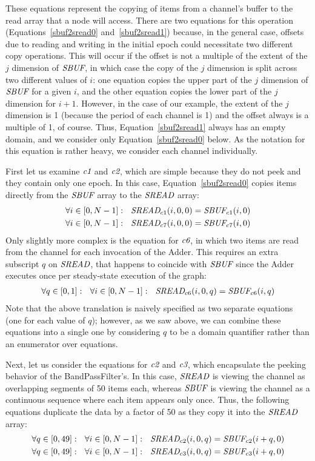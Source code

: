 
These equations represent the copying of items from a channel's buffer
to the read array that a node will access.  There are two equations
for this operation (Equations~\ref{sbuf2sread0} and~\ref{sbuf2sread1})
because, in the general case, offsets due to reading and writing in
the initial epoch could necessitate two different copy operations.
This will occur if the offset is not a multiple of the extent of the
$j$ dimension of $\mbox{\it SBUF}$, in which case the copy of the $j$
dimension is split across two different values of $i$: one equation
copies the upper part of the $j$ dimension of $\mbox{\it SBUF}$ for a given
$i$, and the other equation copies the lower part of the $j$ dimension
for $i+1$.  However, in the case of our example, the extent of the $j$
dimension is 1 (because the period of each channel is 1) and the
offset always is a multiple of 1, of course.  Thus,
Equation~\ref{sbuf2sread1} always has an empty domain, and we consider
only Equation~\ref{sbuf2sread0} below.  As the notation for this
equation is rather heavy, we consider each channel individually.

First let us examine $\mbox{\it c1}$ and $\mbox{\it c2}$, which are simple because
they do not peek and they contain only one epoch.  In this case,
Equation~\ref{sbuf2sread0} copies items directly from the $\mbox{\it SBUF}$
array to the $\mbox{\it SREAD}$ array:
\begin{align*}
\forall i \in [0,N-1]:~~\mbox{\it SREAD}_{c1}(i,0,0) = \mbox{\it SBUF}_{c1}(i,0) \\
\forall i \in [0,N-1]:~~\mbox{\it SREAD}_{c7}(i,0,0) = \mbox{\it SBUF}_{c7}(i,0)
\end{align*}
Only slightly more complex is the equation for $\mbox{\it c6}$, in which two
items are read from the channel for each invocation of the Adder.
This requires an extra subscript $q$ on $\mbox{\it SREAD}$, that happens to
coincide with $\mbox{\it SBUF}$ since the Adder executes once per
steady-state execution of the graph:
\begin{align*}
\forall q \in [0,1]:~~\forall i \in [0,N-1]:~~\mbox{\it SREAD}_{c6}(i,0,q) = \mbox{\it SBUF}_{c6}(i,q)
\end{align*}
Note that the above translation is naively specified as two separate
equations (one for each value of $q$); however, as we saw above, we
can combine these equations into a single one by considering $q$ to be
a domain quantifier rather than an enumerator over equations.

Next, let us consider the equations for $\mbox{\it c2}$ and $\mbox{\it c3}$, which
encapsulate the peeking behavior of the BandPassFilter's.  In this
case, $\mbox{\it SREAD}$ is viewing the channel as overlapping segments of
50 items each, whereas $\mbox{\it SBUF}$ is viewing the channel as a
continuous sequence where each item appears only once.  Thus, the
following equations duplicate the data by a factor of 50 as they copy
it into the $\mbox{\it SREAD}$ array:
\begin{align*}
\forall q \in [0,49]:~~\forall i \in [0,N-1]:~~\mbox{\it SREAD}_{c2}(i,0,q) = \mbox{\it SBUF}_{c2}(i+q,0) \\
\forall q \in [0,49]:~~\forall i \in [0,N-1]:~~\mbox{\it SREAD}_{c3}(i,0,q) = \mbox{\it SBUF}_{c3}(i+q,0)
\end{align*}

